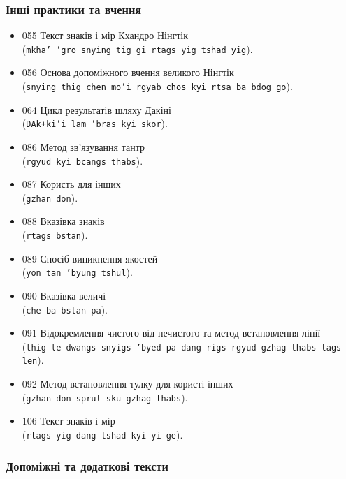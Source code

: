 \documentclass{article}
\begin{document}
\subsubsection{Інші практики та вчення}

\begingroup\raggedright
\begin{itemize}
\item 055 Текст знаків і мір Кхандро Нінгтік \\ (\texttt{mkha' 'gro snying tig gi rtags yig tshad yig}).
\item 056 Основа допоміжного вчення великого Нінгтік \\ (\texttt{snying thig chen mo'i rgyab chos kyi rtsa ba bdog go}).
\item 064 Цикл результатів шляху Дакіні \\ (\texttt{DAk+ki'i lam 'bras kyi skor}).
\item 086 Метод зв’язування тантр \\ (\texttt{rgyud kyi bcangs thabs}).
\item 087 Користь для інших \\ (\texttt{gzhan don}).
\item 088 Вказівка знаків \\ (\texttt{rtags bstan}).
\item 089 Спосіб виникнення якостей \\ (\texttt{yon tan 'byung tshul}).
\item 090 Вказівка величі \\ (\texttt{che ba bstan pa}).
\item 091 Відокремлення чистого від нечистого та метод встановлення лінії \\ (\texttt{thig le dwangs snyigs 'byed pa dang rigs rgyud gzhag thabs lags len}).
\item 092 Метод встановлення тулку для користі інших \\ (\texttt{gzhan don sprul sku gzhag thabs}).
\item 106 Текст знаків і мір \\ (\texttt{rtags yig dang tshad kyi yi ge}).
\end{itemize}
\endgroup

\subsubsection{Допоміжні та додаткові тексти}
\end{document}
